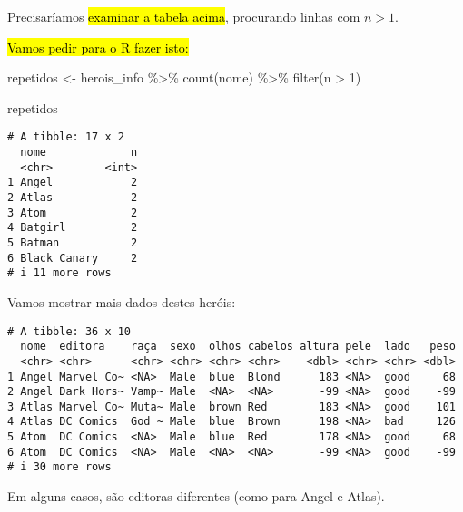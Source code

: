 \documentclass[
  letterpaper,
  DIV=11,
  numbers=noendperiod]{scrreprt}
\newenvironment{Shaded}{\begin{snugshade}}{\end{snugshade}}
\newcommand{\DecValTok}[1]{\textcolor[rgb]{0.68,0.00,0.00}{#1}}
\newcommand{\FunctionTok}[1]{\textcolor[rgb]{0.28,0.35,0.67}{#1}}
\newcommand{\NormalTok}[1]{\textcolor[rgb]{0.00,0.23,0.31}{#1}}
\newcommand{\OtherTok}[1]{\textcolor[rgb]{0.00,0.23,0.31}{#1}}
\newcommand{\SpecialCharTok}[1]{\textcolor[rgb]{0.37,0.37,0.37}{#1}}
\begin{document}
\begin{enumerate}
\begin{tcolorbox}
  Precisaríamos {\hl{examinar a tabela acima}}, procurando linhas com
  $n > 1$.

  {\hl{Vamos pedir para o R fazer isto:}}

\begin{Shaded}
\begin{Highlighting}[]
\NormalTok{repetidos }\OtherTok{\textless{}{-}}\NormalTok{ herois\_info }\SpecialCharTok{\%\textgreater{}\%} 
  \FunctionTok{count}\NormalTok{(nome) }\SpecialCharTok{\%\textgreater{}\%} 
  \FunctionTok{filter}\NormalTok{(n }\SpecialCharTok{\textgreater{}} \DecValTok{1}\NormalTok{)}

\NormalTok{repetidos}
\end{Highlighting}
\end{Shaded}

\begin{verbatim}
# A tibble: 17 x 2
  nome             n
  <chr>        <int>
1 Angel            2
2 Atlas            2
3 Atom             2
4 Batgirl          2
5 Batman           2
6 Black Canary     2
# i 11 more rows
\end{verbatim}

  Vamos mostrar mais dados destes heróis:

\begin{Shaded}
\end{Shaded}

\begin{verbatim}
# A tibble: 36 x 10
  nome  editora    raça  sexo  olhos cabelos altura pele  lado   peso
  <chr> <chr>      <chr> <chr> <chr> <chr>    <dbl> <chr> <chr> <dbl>
1 Angel Marvel Co~ <NA>  Male  blue  Blond      183 <NA>  good     68
2 Angel Dark Hors~ Vamp~ Male  <NA>  <NA>       -99 <NA>  good    -99
3 Atlas Marvel Co~ Muta~ Male  brown Red        183 <NA>  good    101
4 Atlas DC Comics  God ~ Male  blue  Brown      198 <NA>  bad     126
5 Atom  DC Comics  <NA>  Male  blue  Red        178 <NA>  good     68
6 Atom  DC Comics  <NA>  Male  <NA>  <NA>       -99 <NA>  good    -99
# i 30 more rows
\end{verbatim}

  Em alguns casos, são editoras diferentes (como para Angel e Atlas).


\end{tcolorbox}
\end{enumerate}
\end{document}
